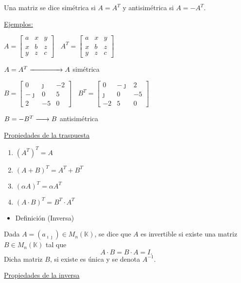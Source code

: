 \documentclass[12pt]{article}
\begin{document}
Una matriz se dice simétrica si $A=A^T$ y antisimétrica si
$A=-A^T$.

\underline{Ejemplos:}

$A=\begin{bmatrix}
        a & x & y \\
        x & b & z \\
        y & z & c
    \end{bmatrix}~~~~A^T=\begin{bmatrix}
        a & x & y \\
        x & b & z \\
        y & z & c
    \end{bmatrix}$

$A=A^T\xrightarrow{\hspace{1.5cm}}A$ simétrica

$B=\begin{bmatrix}
        0  & \jmath   & -2 \\
        -\jmath  & 0  & 5  \\
        2  & -5 & 0
    \end{bmatrix}~~~~B^T=\begin{bmatrix}
        0  & -\jmath  & 2  \\
        \jmath   & 0  & -5 \\
        -2 & 5  & 0
    \end{bmatrix}$

$B=-B^T\xrightarrow{\hspace{0.5cm}}B$ antisimétrica

\underline{Propiedades de la traspuesta}

\begin{enumerate}
    \item $(A^T)^T=A$
    \item $(A+B)^T=A^T+B^T$
    \item $(\alpha A)^T=\alpha A^T$
    \item $(A\cdot B)^T=B^T\cdot A^T$
\end{enumerate}
\begin{itemize}[label=\color{red}\textbullet, leftmargin=*]
    \item \color{lightblue} Definición (Inversa)
\end{itemize}
Dada $A=(a_{\imath\jmath  })\in M_n(\mathbb{K})$, se dice que $A$ es
invertible si existe una matriz $B\in M_n(\mathbb{K})$ tal que
\[A\cdot B=B\cdot A=I.\]
Dicha matriz $B$, si existe es única y se denota $A^{-1}$.

\underline{Propiedades de la inversa}
\end{document}
